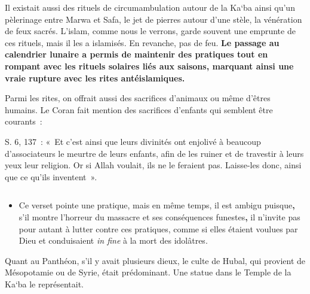 Il existait aussi des rituels de circumambulation autour de la Ka`ba
ainsi qu'un pèlerinage entre Marwa et Safa, le jet de pierres autour
d'une stèle, la vénération de feux sacrés. L'islam, comme nous le
verrons, garde souvent une emprunte de ces rituels, mais il les a
islamisés. En revanche, pas de feu. \textbf{Le passage au calendrier
lunaire a permis de maintenir des pratiques tout en rompant avec les
rituels solaires liés aux saisons, marquant ainsi une vraie rupture avec
les rites antéislamiques.}

Parmi les rites, on offrait aussi des sacrifices d'animaux ou même
d'êtres humains. Le Coran fait mention des sacrifices d'enfants qui
semblent être courants~:

S. 6, 137~: «~Et c'est ainsi que leurs divinités ont enjolivé à beaucoup
d'associateurs le meurtre de leurs enfants, afin de les ruiner et de
travestir à leurs yeux leur religion. Or si Allah voulait, ils ne le
feraient pas. Laisse-les donc, ainsi que ce qu'ils inventent~».

\begin{longtable}[]{@{}l@{}}
\toprule
\endhead
 \\
\bottomrule
\end{longtable}

\begin{itemize}
\item
  Ce verset pointe une pratique, mais en même temps, il est ambigu
  puisque\textbf{,} s'il montre l'horreur du massacre et ses
  conséquences funestes\textbf{,} il n'invite pas pour autant à lutter
  contre ces pratiques, comme si elles étaient voulues par Dieu et
  conduisaient \emph{in fine} à la mort des idolâtres.
\end{itemize}

Quant au Panthéon, s'il y avait plusieurs dieux, le culte de Hubal, qui
provient de Mésopotamie ou de Syrie, était prédominant. Une statue dans le Temple
de la Ka`ba le représentait.



